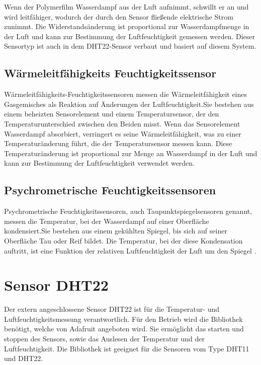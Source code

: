 Wenn der Polymerfilm Wasserdampf aus der Luft aufnimmt, schwillt er an und wird leitfähiger, wodurch der durch den Sensor fließende elektrische Strom zunimmt. Die Widerstandsänderung ist proportional zur Wasserdampfmenge in der Luft und kann zur Bestimmung der Luftfeuchtigkeit gemessen werden. Dieser Sensortyp ist auch in dem DHT22-Sensor verbaut und basiert auf diesem System. 

\subsection{Wärmeleitfähigkeits Feuchtigkeitssensor}

Wärmeleitfähigkeits-Feuchtigkeitssensoren messen die Wärmeleitfähigkeit eines Gasgemisches als Reaktion auf Änderungen der Luftfeuchtigkeit.Sie bestehen aus einem beheizten Sensorelement und einem Temperatursensor, der den Temperaturunterschied zwischen den Beiden misst. Wenn das Sensorelement Wasserdampf absorbiert, verringert es seine Wärmeleitfähigkeit, was zu einer Temperaturänderung führt, die der Temperatursensor messen kann. Diese Temperaturänderung ist proportional zur Menge an Wasserdampf in der Luft und kann zur Bestimmung der Luftfeuchtigkeit verwendet werden.

\subsection{Psychrometrische Feuchtigkeitssensoren}

Psychrometrische Feuchtigkeitssensoren, auch Taupunktspiegelsensoren genannt, messen die Temperatur, bei der Wasserdampf auf einer Oberfläche kondensiert.Sie bestehen aus einem gekühlten Spiegel, bis sich auf seiner Oberfläche Tau oder Reif bildet. Die Temperatur, bei der diese Kondensation auftritt, ist eine Funktion der relativen Luftfeuchtigkeit der Luft um den Spiegel \cite {Hengko:2024}.


\section{Sensor DHT22}

Der extern angeschlossene Sensor DHT22 ist für die Temperatur- und Luftfeuchtigkeitsmessung verantwortlich. Für den Betrieb wird die Bibliothek  benötigt, welche von Adafruit angeboten wird. Sie ermöglicht das starten und stoppen des Sensors, sowie das Auslesen der Temperatur und der Luftfeuchtigkeit. Die Bibliothek ist geeignet für die Sensoren vom Type DHT11 und DHT22.

